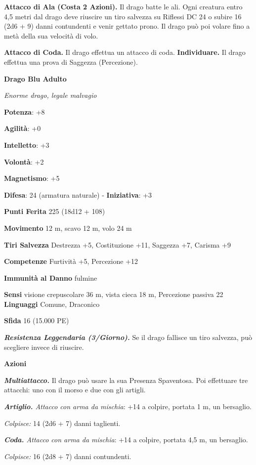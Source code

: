 \begin{multicols}{2}
\textbf{Attacco di Ala (Costa 2 Azioni).} Il drago batte le ali. Ogni
creatura entro 4,5 metri dal drago deve riuscire un tiro salvezza su Riflessi DC 24 o subire 16 (2d6 + 9) danni contundenti e venir gettato
prono. Il drago può poi volare fino a metà della sua velocità di volo.

\textbf{Attacco di Coda.} Il drago effettua un attacco di coda.
\textbf{Individuare.} Il drago effettua una prova di Saggezza
(Percezione).

\textbf{Drago Blu Adulto}

\emph{Enorme drago, legale malvagio}

\textbf{Potenza}: +8

\textbf{Agilità}: +0

\textbf{Intelletto}: +3

\textbf{Volontà}: +2

\textbf{Magnetismo}: +5

\textbf{Difesa}: 24 (armatura naturale) - \textbf{Iniziativa}: +3

\textbf{Punti Ferita} 225 (18d12 + 108)

\textbf{Movimento} 12 m, scavo 12 m, volo 24 m

\textbf{Tiri Salvezza} Destrezza +5, Costituzione +11, Saggezza +7,
Carisma +9

\textbf{Competenze} Furtività +5, Percezione +12

\textbf{Immunità al Danno} fulmine

\textbf{Sensi} visione crepuscolare 36 m, vista cieca 18 m, Percezione passiva
22 \textbf{Linguaggi} Comune, Draconico

\textbf{Sfida} 16 (15.000 PE)\smallskip

\emph{\textbf{Resistenza Leggendaria (3/Giorno).}} Se il drago fallisce
un tiro salvezza, può scegliere invece di riuscire.

\smallskip\textbf{Azioni}

\emph{\textbf{Multiattacco.}} Il drago può usare la sua Presenza
Spaventosa. Poi effettuare tre attacchi: uno con il morso e due con gli
artigli.

\emph{\textbf{Artiglio.} Attacco con arma da mischia}: +14 a colpire,
portata 1 m, un bersaglio.

\emph{Colpisce:} 14 (2d6 + 7) danni taglienti.

\emph{\textbf{Coda.} Attacco con arma da mischia}: +14 a colpire,
portata 4,5 m, un bersaglio.

\emph{Colpisce:} 16 (2d8 + 7) danni contundenti.


\end{multicols}
